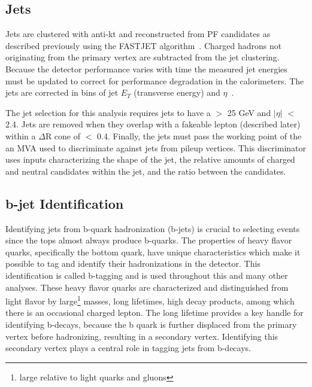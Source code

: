 \subsection{Jets}
Jets are clustered with anti-kt and reconstructed from PF candidates as described previously using the FASTJET algorithm~\cite{antikt}\cite{fastjet}.
Charged hadrons not originating from the primary vertex are subtracted from the jet clustering. Because the detector performance varies with time the measured jet energies
must be updated to correct for performance degradation in the calorimeters. The jets are corrected in bins of jet $E_{T}$ (transverse energy) and $\eta$~\cite{jec}.

The jet selection for this analysis requires jets to have a \pt $>$ 25 GeV and $|\eta|$ $<$ 2.4. Jets are removed when they overlap with a fakeable lepton (described later) within
a $\Delta$R cone of $<$ 0.4. Finally, the jets must pass the working point of the an MVA used to discriminate against jets from pileup vertices. This discriminator uses inputs
characterizing the shape of the jet, the relative amounts of charged and neutral candidates within the jet, and the \pt ratio between the candidates. 

\subsection{b-jet Identification}

Identifying jets from b-quark hadronization (b-jets) is crucial to selecting \tth events since the tops almost always produce b-quarks.
The properties of heavy flavor quarks, specifically the bottom quark, have unique characteristics which make it possible to tag and identify their
hadronizations in the detector. This identification is called
b-tagging and is used throughout this and many other analyses. These heavy flavor quarks are characterized and distinguished from light flavor
 by large\footnote{large relative to light quarks and gluons} masses,
long lifetimes, high \pt decay products, among which there is an occasional charged lepton.
The long lifetime provides a key handle for identifying b-decays, because the b quark is further displaced from the primary vertex before hadronizing,
resulting in a secondary vertex. Identifying this secondary vertex plays a central role in tagging jets from b-decays.

